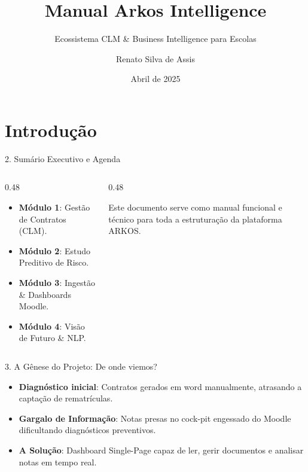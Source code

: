 \documentclass[10pt, aspectratio=169]{beamer}
\title[Manual Arkos Intelligence]{Manual Arkos Intelligence}
\subtitle{Ecossistema CLM \& Business Intelligence para Escolas}
\author[Renato Silva de Assis]{Renato Silva de Assis}
\institute[UFPB / ARKOS]{Ciência de Dados para Negócios -- UFPB \\ Plataforma \textbf{ARKOS}}
\date{Abril de 2025}
\begin{document}
\begin{frame}[plain]
    \titlepage
\end{frame}

\section{Introdução}

\begin{frame}{2. Sumário Executivo e Agenda}
    \begin{columns}[onlytextwidth]
        \begin{column}{0.48\textwidth}
            \begin{tcolorbox}[enhanced,title=Módulos Abordados,colback=black!30,colframe=ArkosGreen,fonttitle=\bfseries]
                \begin{itemize}
                    \item \textbf{Módulo 1}: Gestão de Contratos (CLM).
                    \item \textbf{Módulo 2}: Estudo Preditivo de Risco.
                    \item \textbf{Módulo 3}: Ingestão & Dashboards Moodle.
                    \item \textbf{Módulo 4}: Visão de Futuro & NLP.
                \end{itemize}
            \end{tcolorbox}
        \end{column}
        \begin{column}{0.48\textwidth}
            \begin{tcolorbox}[enhanced,title=O que esperar deste Manual,colback=black!30,colframe=cyan,fonttitle=\bfseries]
                Este documento serve como manual funcional e técnico para toda a estruturação da plataforma ARKOS.
            \end{tcolorbox}
        \end{column}
    \end{columns}
\end{frame}

\begin{frame}{3. A Gênese do Projeto: De onde viemos?}
    \begin{itemize}
        \item \textbf{Diagnóstico inicial}: Contratos gerados em word manualmente, atrasando a captação de rematrículas.
        \item \textbf{Gargalo de Informação}: Notas presas no cock-pit engessado do Moodle dificultando diagnósticos preventivos.
        \item \textbf{A Solução}: Dashboard Single-Page capaz de ler, gerir documentos e analisar notas em tempo real.
    \end{itemize}
\end{frame}
\end{document}
